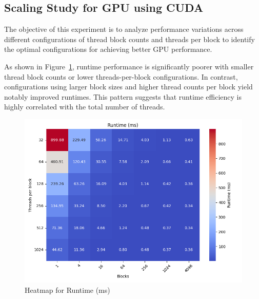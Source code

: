 \subsection{Scaling Study for GPU using CUDA}
\label{subsec:gpu-cuda-study}
The objective of this experiment is to analyze performance variations across different configurations of thread block counts and threads per block to identify the optimal configurations for achieving better GPU performance.

As shown in Figure~\ref{fig:runtime_heatmap}, runtime performance is significantly poorer with smaller thread block counts or lower threads-per-block configurations. In contrast, configurations using larger block sizes and higher thread counts per block yield notably improved runtimes. This pattern suggests that runtime efficiency is highly correlated with the total number of threads.

\begin{figure}[htbp]
    \includegraphics[width=1.0\linewidth]{images/Runtime (ms).png}
    \caption{Heatmap for Runtime (ms)}
    \label{fig:runtime_heatmap}
\end{figure}


